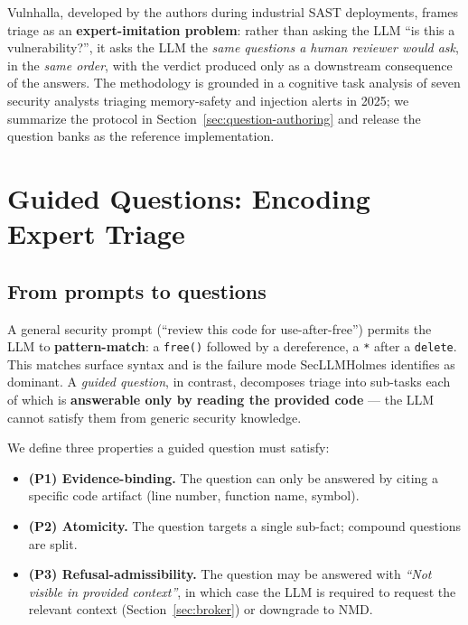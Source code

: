 \documentclass[11pt,a4paper]{article}
\begin{document}
Vulnhalla, developed by the authors during industrial SAST deployments,
frames triage as an \textbf{expert-imitation problem}: rather than
asking the LLM ``is this a vulnerability?'', it asks the LLM the
\emph{same questions a human reviewer would ask}, in the \emph{same
order}, with the verdict produced only as a downstream consequence of
the answers. The methodology is grounded in a cognitive task analysis
of seven security analysts triaging memory-safety and injection alerts
in 2025; we summarize the protocol in
Section~\ref{sec:question-authoring} and release the question banks as
the reference implementation.

\section{Guided Questions: Encoding Expert Triage}
\label{sec:questions}

\subsection{From prompts to questions}

A general security prompt (``review this code for use-after-free'')
permits the LLM to \textbf{pattern-match}: a \texttt{free()} followed
by a dereference, a \texttt{*} after a \texttt{delete}. This matches
surface syntax and is the failure mode SecLLMHolmes identifies as
dominant. A \emph{guided question}, in contrast, decomposes triage into
sub-tasks each of which is \textbf{answerable only by reading the
provided code} --- the LLM cannot satisfy them from generic security
knowledge.

We define three properties a guided question must satisfy:

\begin{itemize}[leftmargin=*]
\item \textbf{(P1) Evidence-binding.} The question can only be answered
  by citing a specific code artifact (line number, function name,
  symbol).
\item \textbf{(P2) Atomicity.} The question targets a single sub-fact;
  compound questions are split.
\item \textbf{(P3) Refusal-admissibility.} The question may be answered
  with \emph{``Not visible in provided context''}, in which case the
  LLM is required to request the relevant context
  (Section~\ref{sec:broker}) or downgrade to NMD.
\end{itemize}
\end{document}
